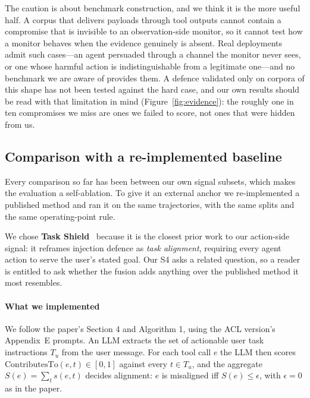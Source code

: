\documentclass[preprint,12pt,number]{elsarticle}
\theoremstyle{definition}
\begin{document}
The caution is about benchmark construction, and we think it is the more useful
half. A corpus that delivers payloads through tool outputs cannot contain a
compromise that is invisible to an observation-side monitor, so it cannot test how
a monitor behaves when the evidence genuinely is absent. Real deployments admit
such cases---an agent persuaded through a channel the monitor never sees, or one
whose harmful action is indistinguishable from a legitimate one---and no benchmark
we are aware of provides them. A defence validated only on corpora of this shape
has not been tested against the hard case, and our own results should be read with
that limitation in mind (Figure~\ref{fig:evidence}): the roughly one in ten
compromises we miss are ones we failed to score, not ones that were hidden from
us.

\subsection{Comparison with a re-implemented baseline}\label{sec:baseline}

Every comparison so far has been between our own signal subsets, which makes the
evaluation a self-ablation. To give it an external anchor we re-implemented a
published method and ran it on the same trajectories, with the same splits and the
same operating-point rule.

We chose \textbf{Task Shield}~\citep{jia2024taskshield} because it is the closest
prior work to our action-side signal: it reframes injection defence as
\emph{task alignment}, requiring every agent action to serve the user's stated
goal. Our S4 asks a related question, so a reader is entitled to ask whether the
fusion adds anything over the published method it most resembles.

\paragraph{What we implemented} We follow the paper's Section 4 and Algorithm 1,
using the ACL version's Appendix~E prompts. An LLM extracts the set of actionable user task
instructions $T_u$ from the user message. For each tool call $e$ the LLM then
scores $\mathrm{ContributesTo}(e,t) \in [0,1]$ against every $t \in T_u$, and the
aggregate $S(e) = \sum_{t} s(e,t)$ decides alignment: $e$ is misaligned iff
$S(e) \le \epsilon$, with $\epsilon = 0$ as in the paper.
\end{document}
